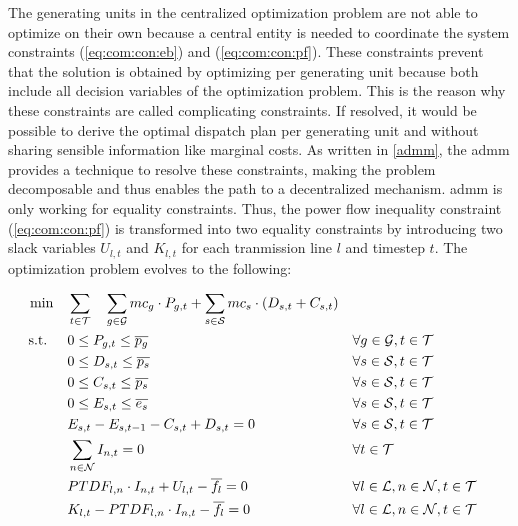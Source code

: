 The generating units in the centralized optimization problem are not able to optimize on their own because a central entity is needed to coordinate the system constraints (\ref{eq:com:con:eb}) and (\ref{eq:com:con:pf}). These constraints prevent that the solution is obtained by optimizing per generating unit because both include all decision variables of the optimization problem. This is the reason why these constraints are called complicating constraints. If resolved, it would be possible to derive the optimal dispatch plan per generating unit and without sharing sensible information like marginal costs. As written in \ref{admm}, the \gls{admm} provides a technique to resolve these constraints, making the problem decomposable and thus enables the path to a decentralized mechanism. \gls{admm} is only working for equality constraints. Thus, the power flow inequality constraint (\ref{eq:com:con:pf}) is transformed into two equality constraints by introducing two slack variables $U_{l,t}$ and $K_{l,t}$ for each tranmission line $l$ and timestep $t$. The optimization problem evolves to the following:

\begin{subequations}
	\begin{align}
		 \min \quad & \sum_{t\in\mathcal{T}} \quad \sum_{g\in\mathcal{G}}mc_g \cdot P_{g,t} + \sum_{s\in\mathcal{S}}mc_s \cdot (D_{s,t}+C_{s,t}) \label{eq:dom:relaxed-constraints}\\
		 \text{s.t. } \quad & 0 \leq P_{g,t} \leq \overline{p_g} && \forall g \in \mathcal{G}, t \in \mathcal{T}\\
		 & 0 \leq D_{s,t} \leq \overline{p_s} && \forall s \in \mathcal{S}, t \in \mathcal{T} \\
		 & 0 \leq C_{s,t} \leq \overline{p_s} && \forall s \in \mathcal{S}, t \in \mathcal{T} \\
		 & 0 \leq E_{s,t} \leq \overline{e_s} && \forall s \in \mathcal{S}, t \in \mathcal{T} \\
		 & E_{s,t} - E_{s,t-1} - C_{s,t} + D_{s,t} = 0 && \forall s \in \mathcal{S}, t \in \mathcal{T}\\
		 & \sum_{n \in \mathcal{N}} I_{n,t} = 0 && \forall t \in \mathcal{T} \\
		 & PTDF_{l,n} \cdot I_{n,t} + U_{l,t} - \overline{f_l} = 0 && \forall l \in \mathcal{L}, n \in \mathcal{N}, t \in \mathcal{T} \label{eq:dom:con:pf-upper} \\
		 & K_{l,t} - PTDF_{l,n} \cdot I_{n,t} - \overline{f_l} = 0 && \forall l \in \mathcal{L}, n \in \mathcal{N}, t \in \mathcal{T} \label{eq:dom:con:pf-lower}
	\end{align}
\end{subequations}

